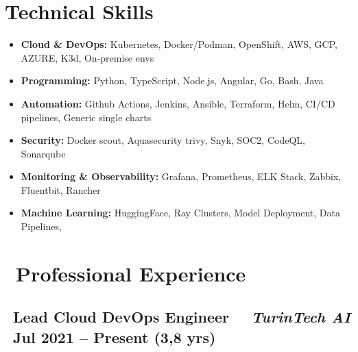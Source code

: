 \documentclass[a4paper,10pt]{article}
\begin{document}
\section*{ Technical Skills}
\begin{itemize}[left=0pt, label=]
    \item \textbf{Cloud \& DevOps:} Kubernetes, Docker/Podman, OpenShift, AWS, GCP, AZURE, K3d, On-premise envs
\end{itemize}
\begin{itemize}[left=0pt, label=]
    \item \textbf{Programming:} Python, TypeScript, Node.js, Angular, Go, Bash, Java
\end{itemize}
\begin{itemize}[left=0pt, label=]
    \item \textbf{Automation:} Github Actions, Jenkins, Ansible, Terraform, Helm, CI/CD pipelines, Generic single charts
\end{itemize}
\begin{itemize}[left=0pt, label=]
    \item \textbf{Security:} Docker scout, Aquasecurity trivy, Snyk, SOC2, CodeQL, Sonarqube
\end{itemize}
\begin{itemize}[left=0pt, label=]
    \item \textbf{Monitoring \& Observability:} Grafana, Prometheus, ELK Stack, Zabbix, Fluentbit, Rancher
\end{itemize}
\begin{itemize}[left=0pt, label=]
    \item \textbf{Machine Learning:} HuggingFace, Ray Clusters, Model Deployment, Data Pipelines, 
\end{itemize}

\vspace{2pt}


\section*{\faBriefcase\ Professional Experience}

\vspace{6pt}

\subsection*{\faBriefcase\ \textbf{Lead Cloud DevOps Engineer} \textbar\ \faBuilding\ \textit{TurinTech AI}   \hfill \faCalendar\ Jul 2021 – Present (3,8 yrs)}
\end{document}
